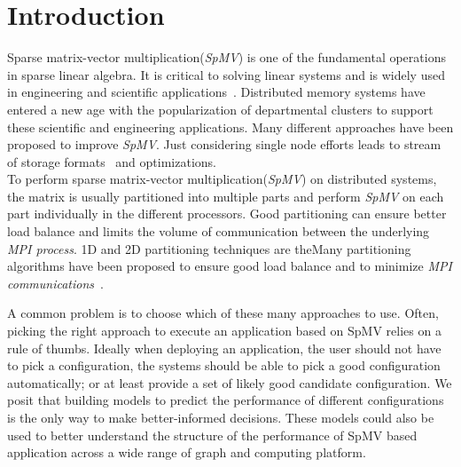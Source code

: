 \documentclass[sigconf,review,anonymous]{acmart}
\begin{document}
\section{Introduction}
Sparse matrix-vector multiplication(\textit{SpMV}) is one of the
fundamental operations in sparse linear algebra. It is critical to
solving linear systems and is widely used in engineering and
scientific applications~\cite{gleich2015pagerank, saad2003iterative,
  dytrych2016efficacy}.  Distributed memory systems have entered a new
age with the popularization of departmental clusters to support these
scientific and engineering applications.  Many different approaches
have been proposed to improve \textit{SpMV}. Just considering single
node efforts leads to stream of storage formats~\cite{almasri20, ashari2014fast, ashari2014efficient, baskaran2009optimizing, bell2009implementing, buluc2011reduced, bulucc2009parallel, choi2010model, deng2009taming, garland2008sparse, greathouse2014efficient, kourtis2010exploiting, li2013smat, li2013gpu, liu2013efficient, su2012clspmv, tang2015optimizing, vuduc2005oski, williams2007optimization, yan2014yaspmv} and optimizations. 
\\
To perform sparse matrix-vector multiplication(\textit{SpMV}) on
distributed systems, the matrix is usually partitioned into multiple
parts and perform \textit{SpMV} on each part individually in the
different processors. Good partitioning can ensure better load balance
and limits the volume of communication between the underlying
\textit{MPI process}. 1D and 2D partitioning techniques are theMany partitioning algorithms have been proposed
to ensure good load balance and to minimize \textit{MPI communications}~\cite{deveci2015hypergraph, karypis1995multilevel,kaya2013analysis}.

A common problem is to choose which of these many approaches to use.
Often, picking the right approach to execute an application based on
SpMV relies on a rule of thumbs. Ideally when deploying an
application, the user should not have to pick a configuration, the
systems should be able to pick a good configuration automatically; or
at least provide a set of likely good candidate configuration. We
posit that building models to predict the performance of different
configurations is the only way to make better-informed
decisions. These models could also be used to better understand the
structure of the performance of SpMV based application across a wide
range of graph and computing platform.
\end{document}
